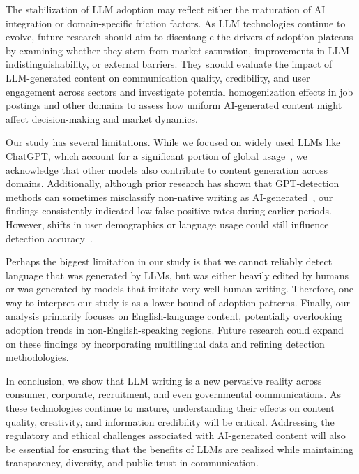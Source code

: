 The stabilization of LLM adoption may reflect either the maturation of AI integration or domain-specific friction factors. As LLM technologies continue to evolve, future research should aim to disentangle the drivers of adoption plateaus by examining whether they stem from market saturation, improvements in LLM indistinguishability, or external barriers. They should evaluate the impact of LLM-generated content on communication quality, credibility, and user engagement across sectors and investigate potential homogenization effects in job postings and other domains to assess how uniform AI-generated content might affect decision-making and market dynamics.


Our study has several limitations. While we focused on widely used LLMs like ChatGPT, which account for a significant portion of global usage~\cite{vanrossum2024generative}, we acknowledge that other models also contribute to content generation across domains. Additionally, although prior research has shown that GPT-detection methods can sometimes misclassify non-native writing as AI-generated~\cite{Liang2023GPTDA}, our findings consistently indicated low false positive rates during earlier periods. However, shifts in user demographics or language usage could still influence detection accuracy~\cite{Globalaitalent}. 

Perhaps the biggest limitation in our study is that we cannot reliably detect language that was generated by LLMs, but was either heavily edited by humans or was generated by models that imitate very well human writing. Therefore, one way to interpret our study is as a lower bound of adoption patterns.
Finally, our analysis primarily focuses on English-language content, potentially overlooking adoption trends in non-English-speaking regions. Future research could expand on these findings by incorporating multilingual data and refining detection methodologies.

In conclusion, we show that LLM writing is a new pervasive reality across consumer, corporate, recruitment, and even governmental communications. As these technologies continue to mature, understanding their effects on content quality, creativity, and information credibility will be critical. Addressing the regulatory and ethical challenges associated with AI-generated content will also be essential for ensuring that the benefits of LLMs are realized while maintaining transparency, diversity, and public trust in communication.
